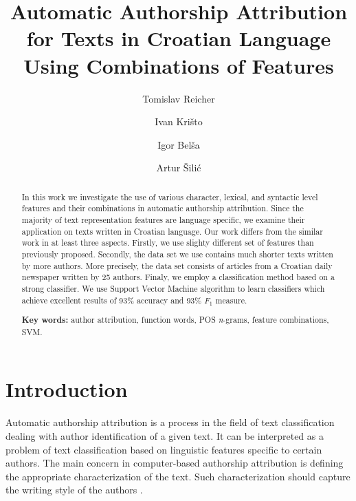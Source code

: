 \documentclass{llncs}
\begin{document}
\title{Automatic Authorship Attribution\\ for Texts in Croatian Language\\ Using
Combinations of Features}
\author{Tomislav Reicher \and Ivan Krišto \and Igor Belša \and Artur Šilić}

\maketitle

\begin{abstract}
In this work we investigate the use of various character, lexical, and syntactic
level features and their combinations in automatic authorship attribution. Since
the majority of text representation features are language specific, we examine
their application on texts written in Croatian language. Our work differs from
the similar work in at least three aspects. Firstly, we use slighty different set
of features than previously proposed. Secondly, the data set we use contains much
shorter texts written by more authors. More precisely, the data set consists of
articles from a Croatian daily newspaper written by 25 authors. Finaly, we employ
a classification method based on a strong classifier. We use Support Vector
Machine algorithm to learn classifiers which achieve excellent results of 93\%
accuracy and 93\% $F_1$ measure.

\vspace{10pt}
\textbf{Key words:} author attribution, function words, POS \emph{n}-grams,
feature combinations, SVM.
\end{abstract}


\section{Introduction}
Automatic authorship attribution is a process in the field of text classification
dealing with author identification of a given text. It can be interpreted
as a problem of text classification based on linguistic features specific to certain
authors. The main concern in computer-based authorship attribution is defining
the appropriate characterization of the text. Such characterization should
capture the writing style of the authors \cite{coyotl2006authorship}.
\end{document}
